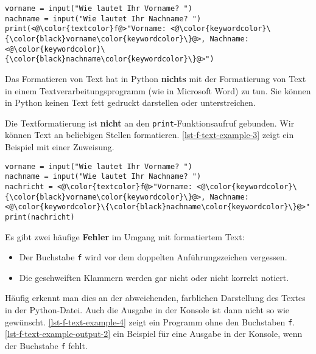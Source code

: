 \begin{lstlisting}[caption={Beide Variablennamen werden während der Ausführung durch den gespeicherten Inhalt ersetzt.}, label={lst-f-text-example-2}]
vorname = input("Wie lautet Ihr Vorname? ")
nachname = input("Wie lautet Ihr Nachname? ")
print(<@\color{textcolor}f@>"Vorname: <@\color{keywordcolor}\{\color{black}vorname\color{keywordcolor}\}@>, Nachname: <@\color{keywordcolor}\{\color{black}nachname\color{keywordcolor}\}@>")
\end{lstlisting}

\begin{important}
	Das Formatieren von Text hat in Python \textbf{nichts} mit der Formatierung von Text in einem Textverarbeitungsprogramm (wie in Microsoft Word) zu tun. Sie können in Python keinen Text fett gedruckt darstellen oder unterstreichen. 
\end{important}

Die Textformatierung ist \textbf{nicht} an den \lstinline{print}-Funktionsaufruf gebunden. Wir können Text an beliebigen Stellen formatieren. \autoref{lst-f-text-example-3} zeigt ein Beispiel mit einer Zuweisung.

\begin{lstlisting}[caption={Formatierter Text in Kombination mit einer Zuweisung.}, label={lst-f-text-example-3}]
vorname = input("Wie lautet Ihr Vorname? ")
nachname = input("Wie lautet Ihr Nachname? ")
nachricht = <@\color{textcolor}f@>"Vorname: <@\color{keywordcolor}\{\color{black}vorname\color{keywordcolor}\}@>, Nachname: <@\color{keywordcolor}\{\color{black}nachname\color{keywordcolor}\}@>"
print(nachricht)
\end{lstlisting}

Es gibt zwei häufige \textbf{Fehler} im Umgang mit formatiertem Text:

\begin{itemize}
	\item Der Buchstabe \lstinline{f} wird vor dem doppelten Anführungszeichen vergessen.
	\item Die geschweiften Klammern werden gar nicht oder nicht korrekt notiert.
\end{itemize}

Häufig erkennt man dies an der abweichenden, farblichen Darstellung des Textes in der Python-Datei. Auch die Ausgabe in der Konsole ist dann nicht so wie gewünscht. \autoref{lst-f-text-example-4} zeigt ein Programm ohne den Buchstaben \lstinline{f}. \autoref{lst-f-text-example-output-2} ein Beispiel für eine Ausgabe in der Konsole, wenn der Buchstabe \lstinline{f} fehlt.


